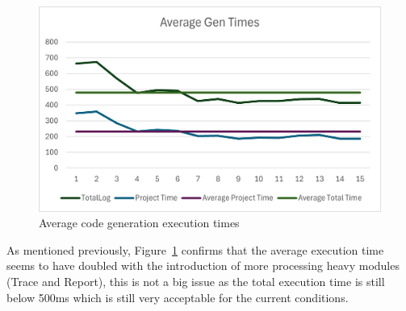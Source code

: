 \begin{figure}[htbp]
	\centering
	\includegraphics[width=\textwidth]{avg_exec_times_1.png}
	\caption{Average code generation execution times}
	\label{fig:avg_exec_times_1}
\end{figure}

As mentioned previously, Figure~\ref{fig:avg_exec_times_1} confirms that the average execution time seems to have doubled with the introduction of more processing heavy modules (Trace and Report), this is not a big issue as the total execution time is still below 500ms which is still very acceptable for the current conditions.



